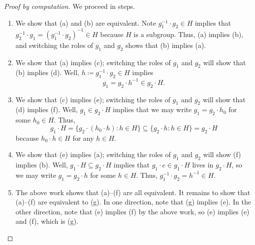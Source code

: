 \documentclass[../main.tex]{subfiles}
\begin{document}
\begin{proof}[Proof by computation]
    We proceed in steps.
    \begin{enumerate}
        \item We show that (a) and (b) are equivalent. Note $g_1^{-1}\cdot g_2\in H$ implies that $g_2^{-1}\cdot g_1=\left(g_1^{-1}\cdot g_2\right)^{-1}\in H$ because $H$ is a subgroup. Thus, (a) implies (b), and switching the roles of $g_1$ and $g_2$ shows that (b) implies (a).
        \item We show that (a) implies (c); switching the roles of $g_1$ and $g_2$ will show that (b) implies (d). Well, $h\coloneqq g_1^{-1}\cdot g_2\in H$ implies
        \[g_1=g_2\cdot h^{-1}\in g_2\cdot H.\]
        \item We show that (c) implies (e); switching the roles of $g_1$ and $g_2$ will show that (d) implies (f). Well, $g_1\in g_2\cdot H$ implies that we may write $g_1=g_2\cdot h_0$ for some $h_0\in H$. Thus,
        \[g_1\cdot H=\{g_2\cdot(h_0\cdot h):h\in H\}\subseteq\{g_2\cdot h:h\in H\}=g_2\cdot H\]
        because $h_0\cdot h\in H$ for any $h\in H$.
        \item We show that (e) implies (a); switching the roles of $g_1$ and $g_2$ will show (f) implies (b). Well, $g_1\cdot H\subseteq g_2\cdot H$ implies that $g_1\cdot e\in g_1\cdot H$ lives in $g_2\cdot H$, so we may write $g_1=g_2\cdot h$ for some $h\in H$. Thus, $g_1^{-1}\cdot g_2=h^{-1}\in H$.
        \item The above work shows that (a)--(f) are all equivalent. It remains to show that (a)--(f) are equivalent to (g). In one direction, note that (g) implies (e). In the other direction, note that (e) implies (f) by the above work, so (e) implies (e) and (f), which is (g).
        \qedhere
    \end{enumerate}
\end{proof}
\end{document}

